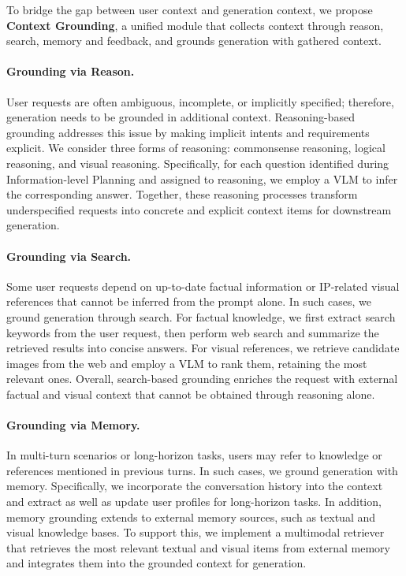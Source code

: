 To bridge the gap between user context and generation context, we propose \textbf{Context Grounding}, a unified module that collects context through reason, search, memory and feedback, and grounds generation with gathered context.

\paragraph{Grounding via Reason.}
User requests are often ambiguous, incomplete, or implicitly specified; therefore, generation needs to be grounded in additional context. Reasoning-based grounding addresses this issue by making implicit intents and requirements explicit. We consider three forms of reasoning: commonsense reasoning, logical reasoning, and visual reasoning. Specifically, for each question identified during Information-level Planning and assigned to reasoning, we employ a VLM to infer the corresponding answer. Together, these reasoning processes transform underspecified requests into concrete and explicit context items for downstream generation.

\paragraph{Grounding via Search.}
Some user requests depend on up-to-date factual information or IP-related visual references that cannot be inferred from the prompt alone. In such cases, we ground generation through search. For factual knowledge, we first extract search keywords from the user request, then perform web search and summarize the retrieved results into concise answers. For visual references, we retrieve candidate images from the web and employ a VLM to rank them, retaining the most relevant ones. Overall, search-based grounding enriches the request with external factual and visual context that cannot be obtained through reasoning alone.

\paragraph{Grounding via Memory.}
In multi-turn scenarios or long-horizon tasks, users may refer to knowledge or references mentioned in previous turns. In such cases, we ground generation with memory. Specifically, we incorporate the conversation history into the context and extract as well as update user profiles for long-horizon tasks. In addition, memory grounding extends to external memory sources, such as textual and visual knowledge bases. To support this, we implement a multimodal retriever that retrieves the most relevant textual and visual items from external memory and integrates them into the grounded context for generation.

